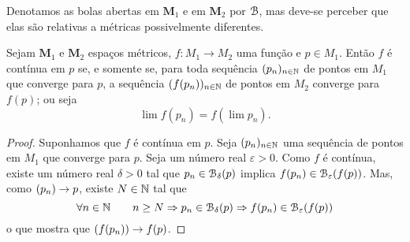 Denotamos as bolas abertas em $\bm M_1$ e em $\bm M_2$ por $\mathcal{B}$, mas deve-se perceber que elas são relativas a métricas possivelmente diferentes. 

\begin{prop}
Sejam $\bm M_1$ e $\bm M_2$ espaços métricos, $f: M_1 \to M_2$ uma função e $p \in M_1$. Então $f$ é contínua em $p$ se, e somente se, para toda sequência $(p_n)_{n \in \mathbb{N}}$ de pontos em $M_1$ que converge para $p$, a sequência $(f(p_n))_{n \in \mathbb{N}}$ de pontos em $M_2$ converge para $f(p)$; ou seja
	\begin{equation*}
	\lim f(p_n) = f(\lim p_n).
	\end{equation*}
\end{prop}
\begin{proof}
	Suponhamos que $f$ é contínua em $p$. Seja $(p_n)_{n \in \mathbb{N}}$ uma sequência de pontos em $M_1$ que converge para $p$. Seja um número real $\varepsilon > 0$. Como $f$ é contínua, existe um número real $\delta > 0$ tal que $p_n \in \mathcal{B}_\delta(p)$ implica $f(p_n) \in \mathcal{B}_\varepsilon(f(p))$. Mas, como $(p_n) \rightarrow p$, existe $N \in \mathbb{N}$ tal que
	\begin{equation*}
	\forall n \in \mathbb{N} \qquad n \geq N \Rightarrow p_n \in \mathcal{B}_\delta(p) \Rightarrow f(p_n) \in \mathcal{B}_\varepsilon(f(p))
	\end{equation*}
o que mostra que $(f(p_n)) \rightarrow f(p)$.
	

\end{proof}
